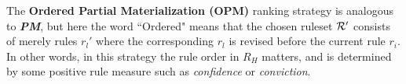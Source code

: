 The \textbf{Ordered Partial Materialization (OPM)} ranking strategy is analogous to \textbf{\emph{PM}}, but here the word ``Ordered" means that the chosen ruleset $\mathcal{R}'$ consists of merely rules $r_l'$ where the corresponding $r_l$ is revised before the current rule $r_i$. In other words, in this strategy the rule order in $R_H$ matters, and is determined by some positive rule measure such as \textit{confidence} or \textit{conviction}.
